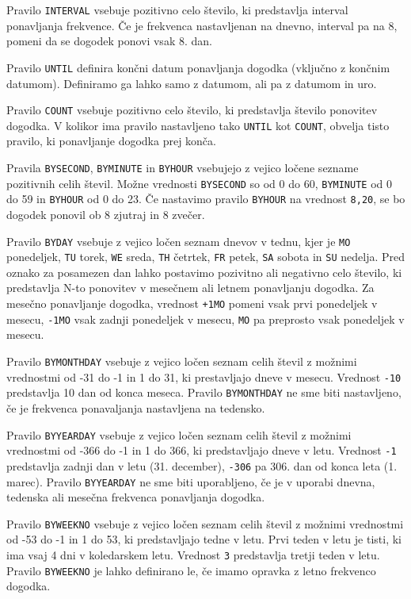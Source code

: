 Pravilo \texttt{INTERVAL} vsebuje pozitivno celo število, ki predstavlja interval ponavljanja frekvence. Če je frekvenca nastavljenan na dnevno, interval pa na 8, pomeni da se dogodek ponovi vsak 8. dan.

Pravilo \texttt{UNTIL} definira končni datum ponavljanja dogodka (vključno z končnim datumom). Definiramo ga lahko samo z datumom, ali pa z datumom in uro.

Pravilo \texttt{COUNT} vsebuje pozitivno celo število, ki predstavlja število ponovitev dogodka. V kolikor ima pravilo nastavljeno tako \texttt{UNTIL} kot \texttt{COUNT}, obvelja tisto pravilo, ki ponavljanje dogodka prej konča.

Pravila \texttt{BYSECOND}, \texttt{BYMINUTE} in \texttt{BYHOUR} vsebujejo z vejico ločene sezname pozitivnih celih števil. Možne vrednosti \texttt{BYSECOND} so od 0 do 60, \texttt{BYMINUTE} od 0 do 59 in \texttt{BYHOUR} od 0 do 23. Če nastavimo pravilo \texttt{BYHOUR} na vrednost \texttt{8,20}, se bo dogodek ponovil ob 8 zjutraj in 8 zvečer.

Pravilo \texttt{BYDAY} vsebuje z vejico ločen seznam dnevov v tednu, kjer je \texttt{MO} ponedeljek, \texttt{TU} torek, \texttt{WE} sreda, \texttt{TH} četrtek, \texttt{FR} petek, \texttt{SA} sobota in \texttt{SU} nedelja. Pred oznako za posamezen dan lahko postavimo pozivitno ali negativno celo število, ki predstavlja N-to ponovitev v mesečnem ali letnem ponavljanju dogodka. Za mesečno ponavljanje dogodka, vrednost \texttt{+1MO} pomeni vsak prvi ponedeljek v mesecu, \texttt{-1MO} vsak zadnji ponedeljek v mesecu, \texttt{MO} pa preprosto vsak ponedeljek v mesecu.

Pravilo \texttt{BYMONTHDAY} vsebuje z vejico ločen seznam celih števil z možnimi vrednostmi od -31 do -1 in 1 do 31, ki prestavljajo dneve v mesecu. Vrednost \texttt{-10} predstavlja 10 dan od konca meseca. Pravilo \texttt{BYMONTHDAY} ne sme biti nastavljeno, če je frekvenca ponavaljanja nastavljena na tedensko.

Pravilo \texttt{BYYEARDAY} vsebuje z vejico ločen seznam celih števil z možnimi vrednostmi od -366 do -1 in 1 do 366, ki predstavljajo dneve v letu. Vrednost \texttt{-1} predstavlja zadnji dan v letu (31. december), \texttt{-306} pa 306. dan od konca leta (1. marec). Pravilo \texttt{BYYEARDAY} ne sme biti uporabljeno, če je v uporabi dnevna, tedenska ali mesečna frekvenca ponavljanja dogodka.

Pravilo \texttt{BYWEEKNO} vsebuje z vejico ločen seznam celih števil z možnimi vrednostmi od -53 do -1 in 1 do 53, ki predstavljajo tedne v letu. Prvi teden v letu je tisti, ki ima vsaj 4 dni v koledarskem letu. Vrednost \texttt{3} predstavlja tretji teden v letu. Pravilo \texttt{BYWEEKNO} je lahko definirano le, če imamo opravka z letno frekvenco dogodka.

